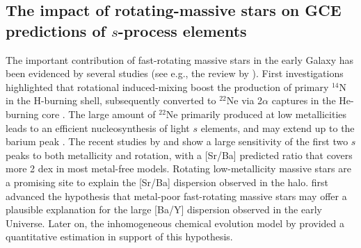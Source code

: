 \documentclass[manuscript]{aastex}
\begin{document}
\subsection{The impact of rotating-massive stars on GCE predictions of $s$-process
elements}\label{rot}

The important contribution of fast-rotating massive stars in the early Galaxy 
has been evidenced by several studies (see e.g., the review by \citealt{maeder12}). 
First investigations highlighted that rotational induced-mixing boost the production
of primary $^{14}$N in the H-burning shell, subsequently converted to $^{22}$Ne via 
2$\alpha$ captures in the He-burning core \citep{meynet06,hirschi07}. The large
amount of $^{22}$Ne primarily produced at low metallicities leads to an efficient 
nucleosynthesis of light $s$ elements, and may extend up to the barium peak 
\citep{pignatari08}. 
The recent studies by \citet{fris12} and \citet{fris16} show a large sensitivity 
of the first two $s$ peaks to both metallicity and rotation, with a [Sr/Ba] predicted
ratio that covers more 2 dex in most metal-free models. Rotating low-metallicity 
massive stars are a promising site to explain the [Sr/Ba] dispersion observed in the 
halo. \citet{chiappini11} first advanced the hypothesis that metal-poor 
fast-rotating massive stars may offer a plausible explanation for the large [Ba/Y] 
dispersion observed in the early Universe. Later on, the inhomogeneous chemical 
evolution model by \citet{cescutti13} provided a quantitative estimation in support
of this hypothesis.
\end{document}
